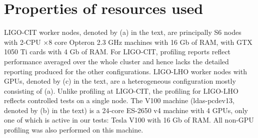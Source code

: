 \documentclass[twocolumn,prd,nofootinbib]{revtex4}
\newcommand\AddedResponse[1]{{\color{blue} {#1}}}
\begin{document}
\appendix
\section{Properties of resources used}
%


\AddedResponse{
LIGO-CIT worker nodes, denoted by (a)  in the text, are principally S6 nodes with 2-CPU $\times 8$ core Opteron
2.3 GHz machines with 16 Gb of RAM, with GTX 1050 Ti cards with 4 Gb of RAM.  For LIGO-CIT, profiling reports reflect
performance averaged over the whole cluster and hence lacks the detailed reporting produced for the other configurations.
% 
LIGO-LHO worker nodes with GPUs, denoted by (c) in the text, are a heterogeneous configuration mostly consisting of
(a).  Unlike profiling at LIGO-CIT, the profiling for LIGO-LHO reflects controlled tests on a single node.
The V100 machine (ldas-pcdev13, denoted by (b) in the text) is  a 24-core ES-2650 v4 machine with 4 GPUs, only one of
which is active in our tests: Tesla V100 with 16 Gb of RAM.
All non-GPU profiling was  also performed on this machine.  
}


\end{document}
